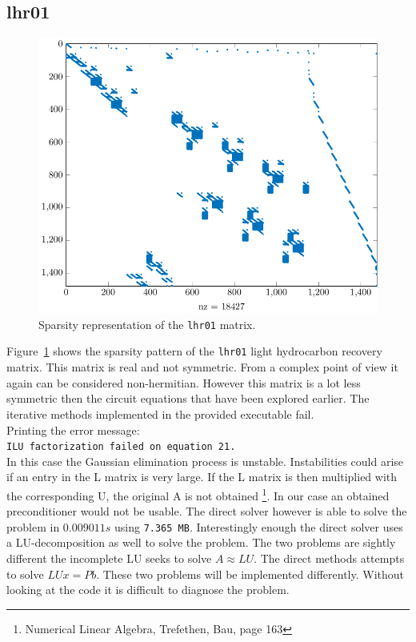 \subsection{lhr01}
\begin{figure}
\centering
\includegraphics[scale=0.8]{../src/figure/lhr01.pdf}
\caption{Sparsity representation of the \texttt{lhr01} matrix.}
\label{fig:lhr01}
\end{figure}
Figure~\ref{fig:lhr01} shows the sparsity pattern of the \texttt{lhr01} light hydrocarbon recovery matrix. This matrix is real and not symmetric. From a complex point of view it again can be considered non-hermitian. However this matrix is a lot less symmetric then the circuit equations that have been explored earlier. The iterative methods implemented in the provided executable fail. \\ Printing the error message: \\
\texttt{ILU factorization failed on equation 21.} \\
In this case the Gaussian elimination process is unstable. Instabilities could arise if an entry in the L matrix is very large. If the L matrix is then multiplied with the corresponding U, the original A is not obtained \footnote{Numerical Linear Algebra, Trefethen, Bau, page 163}. In our
case an obtained preconditioner would not be usable. The direct solver however is able to solve the problem in $0.009011 s$ using \texttt{7.365 MB}. Interestingly enough the direct solver uses a LU-decomposition as well to solve the problem. The two problems are sightly different the incomplete LU seeks to solve $A \approx LU$. The direct methods attempts to solve $LUx = Pb$. These two problems will be implemented differently. Without looking at the code it is difficult to diagnose the problem.


